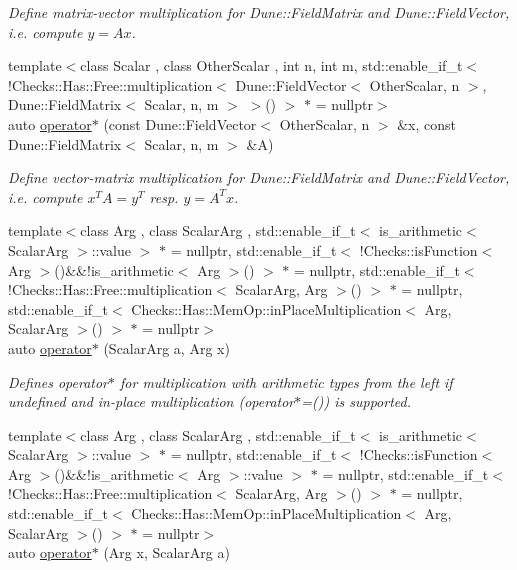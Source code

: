 \begin{DoxyCompactItemize}
\begin{DoxyCompactList}\small\item\em \-Define matrix-\/vector multiplication for \-Dune\-::\-Field\-Matrix and \-Dune\-::\-Field\-Vector, i.\-e. compute $y=Ax$. \end{DoxyCompactList}\item 
{\footnotesize template$<$class Scalar , class Other\-Scalar , int n, int m, std\-::enable\-\_\-if\-\_\-t$<$ !\-Checks\-::\-Has\-::\-Free\-::multiplication$<$ Dune\-::\-Field\-Vector$<$ Other\-Scalar, n $>$, Dune\-::\-Field\-Matrix$<$ Scalar, n, m $>$ $>$() $>$ $\ast$  = nullptr$>$ }\\auto \hyperlink{namespaceFunG_a19a9d7b55b56f5101560034413a1dbfe}{operator$\ast$} (const \-Dune\-::\-Field\-Vector$<$ \-Other\-Scalar, n $>$ \&x, const \-Dune\-::\-Field\-Matrix$<$ \-Scalar, n, m $>$ \&\-A)
\begin{DoxyCompactList}\small\item\em \-Define vector-\/matrix multiplication for \-Dune\-::\-Field\-Matrix and \-Dune\-::\-Field\-Vector, i.\-e. compute $x^T A = y^T$ resp. $y=A^T x$. \end{DoxyCompactList}\item 
{\footnotesize template$<$class Arg , class Scalar\-Arg , std\-::enable\-\_\-if\-\_\-t$<$ is\-\_\-arithmetic$<$ Scalar\-Arg $>$\-::value $>$ $\ast$  = nullptr, std\-::enable\-\_\-if\-\_\-t$<$ !\-Checks\-::is\-Function$<$ Arg $>$()\&\&!is\-\_\-arithmetic$<$ Arg $>$() $>$ $\ast$  = nullptr, std\-::enable\-\_\-if\-\_\-t$<$ !\-Checks\-::\-Has\-::\-Free\-::multiplication$<$ Scalar\-Arg, Arg $>$() $>$ $\ast$  = nullptr, std\-::enable\-\_\-if\-\_\-t$<$ Checks\-::\-Has\-::\-Mem\-Op\-::in\-Place\-Multiplication$<$ Arg, Scalar\-Arg $>$() $>$ $\ast$  = nullptr$>$ }\\auto \hyperlink{namespaceFunG_ac71b238827eda3b6518c39e49447bdeb}{operator$\ast$} (\-Scalar\-Arg a, \-Arg x)
\begin{DoxyCompactList}\small\item\em \-Defines operator$\ast$ for multiplication with arithmetic types from the left if undefined and in-\/place multiplication (operator$\ast$=()) is supported. \end{DoxyCompactList}\item 
{\footnotesize template$<$class Arg , class Scalar\-Arg , std\-::enable\-\_\-if\-\_\-t$<$ is\-\_\-arithmetic$<$ Scalar\-Arg $>$\-::value $>$ $\ast$  = nullptr, std\-::enable\-\_\-if\-\_\-t$<$ !\-Checks\-::is\-Function$<$ Arg $>$()\&\&!is\-\_\-arithmetic$<$ Arg $>$\-::value $>$ $\ast$  = nullptr, std\-::enable\-\_\-if\-\_\-t$<$ !\-Checks\-::\-Has\-::\-Free\-::multiplication$<$ Scalar\-Arg, Arg $>$() $>$ $\ast$  = nullptr, std\-::enable\-\_\-if\-\_\-t$<$ Checks\-::\-Has\-::\-Mem\-Op\-::in\-Place\-Multiplication$<$ Arg, Scalar\-Arg $>$() $>$ $\ast$  = nullptr$>$ }\\auto \hyperlink{namespaceFunG_a49623beb215912a02388a11cc18f15fe}{operator$\ast$} (\-Arg x, \-Scalar\-Arg a)

\end{DoxyCompactItemize}
